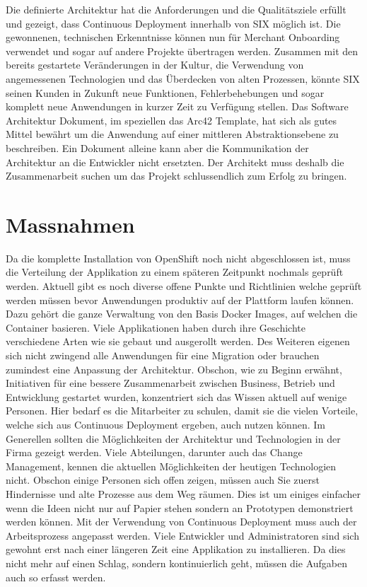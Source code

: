 Die definierte Architektur hat die Anforderungen und die Qualitätsziele erfüllt und gezeigt, dass Continuous Deployment innerhalb von SIX möglich ist. Die gewonnenen, technischen Erkenntnisse können nun für Merchant Onboarding verwendet und sogar auf andere Projekte übertragen werden. Zusammen mit den bereits gestartete Veränderungen in der Kultur, die Verwendung von angemessenen Technologien und das Überdecken von alten Prozessen, könnte SIX seinen Kunden in Zukunft neue Funktionen, Fehlerbehebungen und sogar komplett neue Anwendungen in kurzer Zeit zu Verfügung stellen.\newline
Das Software Architektur Dokument, im speziellen das Arc42 Template, hat sich als gutes Mittel bewährt um die Anwendung auf einer mittleren Abstraktionsebene zu beschreiben. Ein Dokument alleine kann aber die Kommunikation der Architektur an die Entwickler nicht ersetzten. Der Architekt muss deshalb die Zusammenarbeit suchen um das Projekt schlussendlich zum Erfolg zu bringen.

\chapter{Massnahmen}
Da die komplette Installation von OpenShift noch nicht abgeschlossen ist, muss die Verteilung der Applikation zu einem späteren Zeitpunkt nochmals geprüft werden. Aktuell gibt es noch diverse offene Punkte und Richtlinien welche geprüft werden müssen bevor Anwendungen produktiv auf der Plattform laufen können. Dazu gehört die ganze Verwaltung von den Basis Docker Images, auf welchen die Container basieren. Viele Applikationen haben durch ihre Geschichte verschiedene Arten wie sie gebaut und ausgerollt werden. Des Weiteren eigenen sich nicht zwingend alle Anwendungen für eine Migration oder brauchen zumindest eine Anpassung der Architektur. Obschon, wie zu Beginn erwähnt, Initiativen für eine bessere Zusammenarbeit zwischen Business, Betrieb und Entwicklung gestartet wurden, konzentriert sich das Wissen aktuell auf wenige Personen. Hier bedarf es die Mitarbeiter zu schulen, damit sie die vielen Vorteile, welche sich aus Continuous Deployment ergeben, auch nutzen können.\newline
Im Generellen sollten die Möglichkeiten der Architektur und Technologien in der Firma gezeigt werden. Viele Abteilungen, darunter auch das Change Management, kennen die aktuellen Möglichkeiten der heutigen Technologien nicht. Obschon einige Personen sich offen zeigen, müssen auch Sie zuerst Hindernisse und alte Prozesse aus dem Weg räumen. Dies ist um einiges einfacher wenn die Ideen nicht nur auf Papier stehen sondern an Prototypen demonstriert werden können.\newline
Mit der Verwendung von Continuous Deployment muss auch der Arbeitsprozess angepasst werden. Viele Entwickler und Administratoren sind sich gewohnt erst nach einer längeren Zeit eine Applikation zu installieren. Da dies nicht mehr auf einen Schlag, sondern kontinuierlich geht, müssen die Aufgaben auch so erfasst werden.